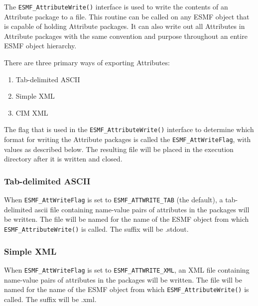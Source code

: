 %

\label{sec:AttributeExports}

The {\tt ESMF\_AttributeWrite()} interface is used to write the contents of an Attribute package to a file.  This routine can be called on any ESMF object that is capable of holding Attribute packages.  It can also write out all Attributes in Attribute packages with the same convention and purpose throughout an entire ESMF object hierarchy. 

There are three primary ways of exporting Attributes:
\begin{enumerate}
   \item Tab-delimited ASCII
   \item Simple XML 
   \item CIM XML
\end{enumerate}

The flag that is used in the {\tt ESMF\_AttributeWrite()} interface to determine which format for writing the Attribute packages is called the {\tt ESMF\_AttWriteFlag}, with values as described below.  The resulting file will be placed in the execution directory after it is written and closed.

\subsubsection{Tab-delimited ASCII}

When {\tt ESMF\_AttWriteFlag} is set to {\tt ESMF\_ATTWRITE\_TAB} (the default), a tab-delimited ascii file containing name-value pairs of attributes in the packages will be written.  The file will be named for the name of the ESMF object from which {\tt ESMF\_AttributeWrite()} is called. The suffix will be .stdout.


\subsubsection{Simple XML}

When {\tt ESMF\_AttWriteFlag} is set to {\tt ESMF\_ATTWRITE\_XML}, an XML file containing name-value pairs of attributes in the packages will be written.  The file will be named for the name of the ESMF object from which {\tt ESMF\_AttributeWrite()} is called. The suffix will be .xml.

